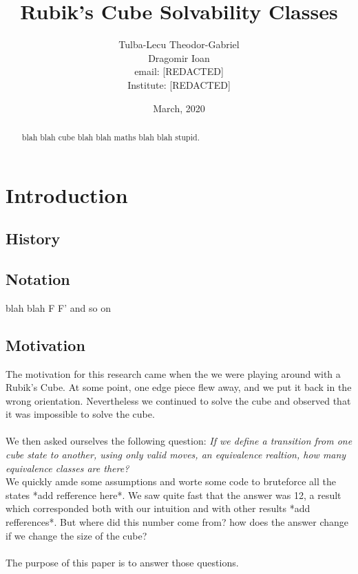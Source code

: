 \documentclass{article}
\title{Rubik's Cube Solvability Classes}
\date{March, 2020}
\author{Tulba-Lecu Theodor-Gabriel\\
	Dragomir Ioan\\
	email: [REDACTED] \\
	Institute: [REDACTED]}
\begin{document}
    
    \maketitle


    \begin{abstract}
        blah blah cube blah blah maths blah blah stupid.
    \end{abstract}

    \tableofcontents
    
    \newpage

    \section{Introduction}
    
        \subsection{History}
            
        
        \subsection{Notation}
            blah blah F F' and so on
        
        \subsection{Motivation}
            The motivation for this research came when the we were playing 
            around with a Rubik's Cube. At some point, one edge piece flew 
            away, and we put it back in the wrong orientation.
            Nevertheless we continued to solve the cube and observed that it
            was impossible to solve the cube. \\ \\
            We then asked ourselves the following question: 
            \textit{If we define a transition from one cube state to another,
            using only valid moves, an equivalence realtion, how many
            equivalence classes are there?} \\
            We quickly amde some assumptions and worte some code to bruteforce 
            all the states *add refference here*. We saw quite fast that the
            answer was 12, a result which corresponded both with our intuition 
            and with other results *add refferences*. But where did this 
            number come from? how does the answer change if we change the 
            size of the cube? \\ \\ 
            The purpose of this paper is to answer those questions.
    
\end{document}
